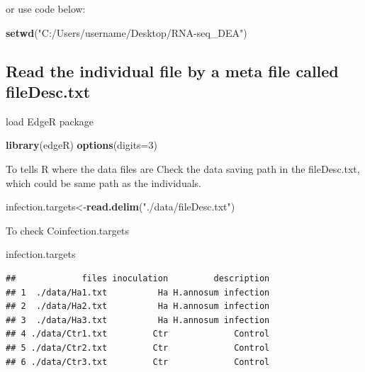 \documentclass[
]{article}
\newenvironment{Shaded}{\begin{snugshade}}{\end{snugshade}}
\newcommand{\AttributeTok}[1]{\textcolor[rgb]{0.13,0.29,0.53}{#1}}
\newcommand{\DecValTok}[1]{\textcolor[rgb]{0.00,0.00,0.81}{#1}}
\newcommand{\FunctionTok}[1]{\textcolor[rgb]{0.13,0.29,0.53}{\textbf{#1}}}
\newcommand{\NormalTok}[1]{#1}
\newcommand{\OtherTok}[1]{\textcolor[rgb]{0.56,0.35,0.01}{#1}}
\newcommand{\StringTok}[1]{\textcolor[rgb]{0.31,0.60,0.02}{#1}}
\begin{document}
or use code below:

\begin{Shaded}
\begin{Highlighting}[]
\FunctionTok{setwd}\NormalTok{(}\StringTok{"C:/Users/username/Desktop/RNA{-}seq\_DEA"}\NormalTok{)}
\end{Highlighting}
\end{Shaded}

\subsection{Read the individual file by a meta file called
fileDesc.txt}\label{read-the-individual-file-by-a-meta-file-called-filedesc.txt}

load EdgeR package

\begin{Shaded}
\begin{Highlighting}[]
\FunctionTok{library}\NormalTok{(edgeR)}
\FunctionTok{options}\NormalTok{(}\AttributeTok{digits=}\DecValTok{3}\NormalTok{)}
\end{Highlighting}
\end{Shaded}

To tells R where the data files are Check the data saving path in the
fileDesc.txt, which could be same path as the individuals.

\begin{Shaded}
\begin{Highlighting}[]
\NormalTok{infection.targets}\OtherTok{\textless{}{-}}\FunctionTok{read.delim}\NormalTok{(}\StringTok{"./data/fileDesc.txt"}\NormalTok{)}
\end{Highlighting}
\end{Shaded}

To check Coinfection.targets

\begin{Shaded}
\begin{Highlighting}[]
\NormalTok{infection.targets}
\end{Highlighting}
\end{Shaded}

\begin{verbatim}
##             files inoculation         description
## 1  ./data/Ha1.txt          Ha H.annosum infection
## 2  ./data/Ha2.txt          Ha H.annosum infection
## 3  ./data/Ha3.txt          Ha H.annosum infection
## 4 ./data/Ctr1.txt         Ctr             Control
## 5 ./data/Ctr2.txt         Ctr             Control
## 6 ./data/Ctr3.txt         Ctr             Control
\end{verbatim}
\end{document}
